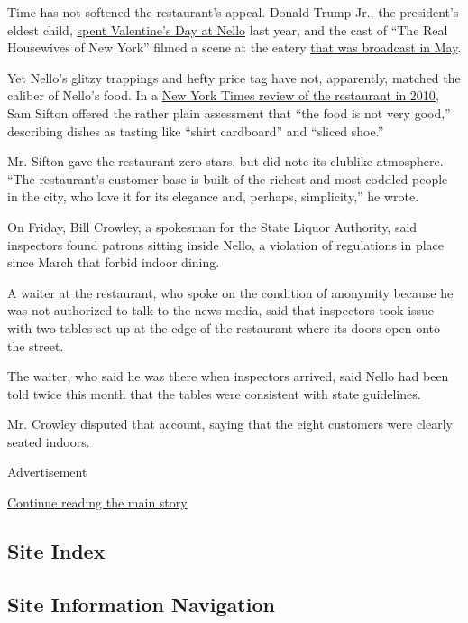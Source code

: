 Time has not softened the restaurant's appeal. Donald Trump Jr., the
president's eldest child,
\href{https://www.instagram.com/p/Bt4w89HA8Hv/?utm_source=ig_embed}{spent
Valentine's Day at Nello} last year, and the cast of ``The Real
Housewives of New York'' filmed a scene at the eatery
\href{https://www.vulture.com/2020/05/real-housewives-of-new-york-city-recap-season-12-episode-6.html}{that
was broadcast in May}.

Yet Nello's glitzy trappings and hefty price tag have not, apparently,
matched the caliber of Nello's food. In a
\href{https://www.nytimes3xbfgragh.onion/2010/04/14/dining/reviews/14rest.html}{New
York Times review of the restaurant in 2010}, Sam Sifton offered the
rather plain assessment that ``the food is not very good,'' describing
dishes as tasting like ``shirt cardboard'' and ``sliced shoe.''

Mr. Sifton gave the restaurant zero stars, but did note its clublike
atmosphere. ``The restaurant's customer base is built of the richest and
most coddled people in the city, who love it for its elegance and,
perhaps, simplicity,'' he wrote.

On Friday, Bill Crowley, a spokesman for the State Liquor Authority,
said inspectors found patrons sitting inside Nello, a violation of
regulations in place since March that forbid indoor dining.

A waiter at the restaurant, who spoke on the condition of anonymity
because he was not authorized to talk to the news media, said that
inspectors took issue with two tables set up at the edge of the
restaurant where its doors open onto the street.

The waiter, who said he was there when inspectors arrived, said Nello
had been told twice this month that the tables were consistent with
state guidelines.

Mr. Crowley disputed that account, saying that the eight customers were
clearly seated indoors.

Advertisement

\protect\hyperlink{after-bottom}{Continue reading the main story}

\hypertarget{site-index}{%
\subsection{Site Index}\label{site-index}}

\hypertarget{site-information-navigation}{%
\subsection{Site Information
Navigation}\label{site-information-navigation}}

